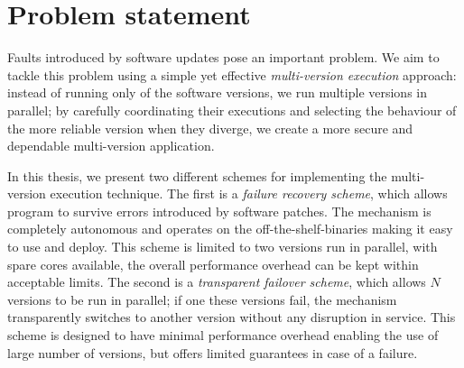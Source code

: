 \section{Problem statement}
\label{overview:problem}

Faults introduced by software updates pose an important problem. We aim to
tackle this problem using a simple yet effective \emph{multi-version execution}
approach: instead of running only of the software versions, we run multiple
versions in parallel; by carefully coordinating their executions and selecting
the behaviour of the more reliable version when they diverge, we create a more
secure and dependable multi-version application.

In this thesis, we present two different schemes for implementing the
multi-version execution technique. The first is a \emph{failure recovery scheme},
which allows program to survive errors introduced by software patches. The
mechanism is completely autonomous and operates on the off-the-shelf-binaries
making it easy to use and deploy. This scheme is limited to two versions run in
parallel, with spare cores available, the overall performance overhead can be
kept within acceptable limits. The second is a \emph{transparent failover
scheme}, which allows $N$ versions to be run in parallel; if one these versions
fail, the mechanism transparently switches to another version without any
disruption in service. This scheme is designed to have minimal performance
overhead enabling the use of large number of versions, but offers limited
guarantees in case of a failure.


